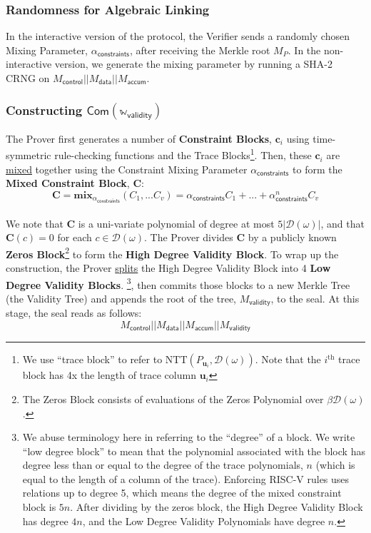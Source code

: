 \documentclass[10pt,letterpaper,titlepage]{article}
\newcommand{\w}[0]{\omega}
\newcommand{\D}[0]{\mathcal{D}}
\theoremstyle{definition}
\begin{document}
\begin{appendices}
\subsubsection{Randomness for Algebraic Linking}
\label{constraint mixing parameter}
In the interactive version of the protocol, the Verifier sends a randomly chosen Mixing Parameter, $\alpha_\mathsf{constraints}$, after receiving the Merkle root $M_{P}$. 
In the non-interactive version, we generate the mixing parameter by running a SHA-2 CRNG on 
$
  M_\mathsf{control}||
  M_\mathsf{data}||
  M_\mathsf{accum}
$.

\subsubsection{Constructing $\mathsf{Com}(\mathbb{w}_\mathsf{validity})$}
\label{committing validity polynomials}
The Prover first generates a number of \textbf{Constraint Blocks}, $\mathbf{c}_i$ using time-symmetric rule-checking functions and the Trace Blocks\footnote{We use ``trace block'' to refer to $\text{NTT}(P_{\mathbf{u}_i},\D(\w))$. 
Note that the $i^\text{th}$ trace block has 4x the length of trace column $\mathbf{u}_i$}. 
Then, these $\mathbf{c}_i$ are \hyperref[mix]{mixed} together using the Constraint Mixing Parameter $\alpha_\mathsf{constraints}$ to form the \textbf{Mixed Constraint Block}, $\mathbf{C}$: 
\[\mathbf{C}=\textbf{mix}_{\alpha_\mathsf{constraints}}(C_1,...C_v)=\alpha_\mathsf{constraints} C_1 + ... + \alpha_\mathsf{constraints}^n C_v\]\\
We note that $\mathbf{C}$ is a uni-variate polynomial of degree at most $5|\D(\w)|$, and that $\mathbf{C}(c)=0$ for each $c\in\D(\w)$.
The Prover divides $\mathbf{C}$ by a publicly known \textbf{Zeros Block}\footnote{The Zeros Block consists of evaluations of the Zeros Polynomial over $\beta\D(\w)$.} to form the \textbf{High Degree Validity Block}. 
To wrap up the construction, the Prover \hyperref[split]{splits} the High Degree Validity Block into 4 \textbf{Low Degree Validity Blocks}.%
\footnote{We abuse terminology here in referring to the ``degree'' of a block. 
We write ``low degree block'' to mean that the polynomial associated with the block has degree less than or equal to the degree of the trace polynomials, $n$  (which is equal to the length of a column of the trace). 
Enforcing RISC-V rules uses relations up to degree 5, which means the degree of the mixed constraint block is $5n$. 
After dividing by the zeros block, the High Degree Validity Block has degree $4n$, and the Low Degree Validity Polynomials have degree $n$.}, then commits those blocks to a new Merkle Tree (the Validity Tree) and appends the root of the tree, $M_\mathsf{validity}$, to the seal. 
At this stage, the seal reads as follows:  
\[
  M_\mathsf{control}||
  M_\mathsf{data}||
  M_\mathsf{accum}||
  M_\mathsf{validity}
\]


\end{appendices}
\end{document}
